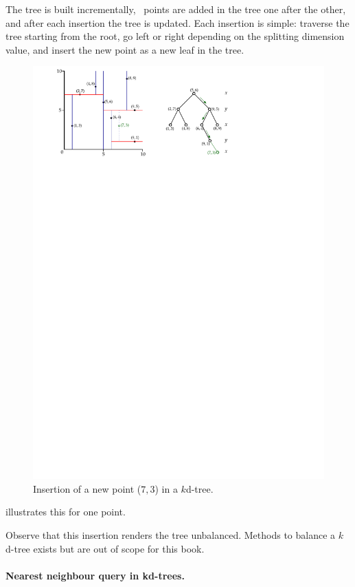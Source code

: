 The tree is built incrementally, \ie\ points are added in the tree one after the other, and after each insertion the tree is updated.
Each insertion is simple: traverse the tree starting from the root, go left or right depending on the splitting dimension value, and insert the new point as a new leaf in the tree.
\begin{figure}[tbp]
  \centering
  \includegraphics[width=0.9\linewidth]{figs/kdtree_insert}
  \caption{Insertion of a new point ($7,3$) in a $k$d-tree.}%
\end{figure} 
illustrates this for one point.

Observe that this insertion renders the tree unbalanced.
Methods to balance a $k$d-tree exists but are out of scope for this book.


\paragraph{Nearest neighbour query in kd-trees.}%
\label{sec:knn}

